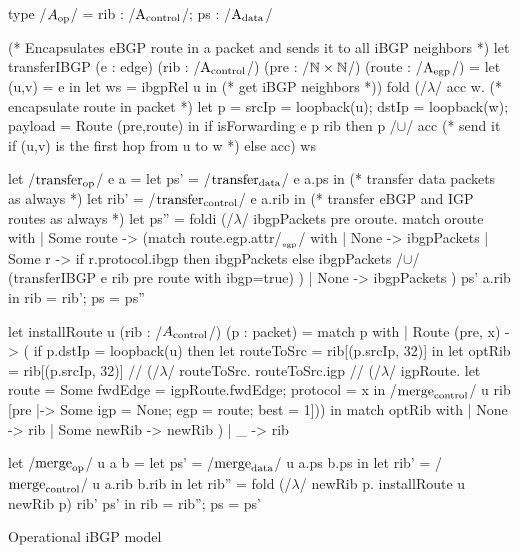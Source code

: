 \documentclass[sigconf,10pt]{acmart}
\begin{document}
\begin{listing}[ht]
  \begin{ocamlcode}
    type /$A_{\op}$/ = { rib : /$\A_{\control}$/; ps : /$\A_{\data}$/ }

    (* Encapsulates eBGP route in a packet and sends it to all iBGP neighbors *)
    let transferIBGP (e : edge) (rib : /$\A_{\control}$/) (pre : /$\nat \times \nat$/) (route : /$\A_{\egp}$/) =
      let (u,v) = e in
      let ws = ibgpRel u in (* get iBGP neighbors *))
      fold (/$\lambda$/ acc w.
       (* encapsulate route in packet *)
        let p = { srcIp = loopback(u);  dstIp = loopback(w);  payload = Route (pre,route) } in
        if isForwarding e p rib then
          {p} /$\cup$/ acc (* send it if (u,v) is the first hop from u to w *)
        else
          acc) {} ws
      
    let /$\transfer_{\op}$/ e a =
      let ps' = /$\transfer_{\data}$/ e a.ps in (* transfer data packets as always *)
      let rib' = /$\transfer_{\control}$/ e a.rib in (* transfer eBGP and IGP routes as always *)
      let ps'' = foldi (/$\lambda$/ ibgpPackets pre oroute.
                        match oroute with
                        | Some route ->
                          (match route.egp.attr/$_{_\egp}$/ with
                           | None -> ibgpPackets
                           | Some r ->
                             if r.protocol.ibgp then
                               ibgpPackets
                             else
                               ibgpPackets /$\cup$/ (transferIBGP e rib pre {route with ibgp=true})
                           )
                        | None -> ibgpPackets ) ps' a.rib
      in
      { rib = rib'; ps = ps''}
      
    let installRoute u (rib : /$A_{\control}$/) (p : packet) =
      match p with
      | Route (pre, x) -> (
        if p.dstIp = loopback(u) then
          let routeToSrc = rib[(p.srcIp, 32)] in
          let optRib =
            rib[(p.srcIp, 32)] /\bind/
            (/$\lambda$/ routeToSrc. routeToSrc.igp /\bind/
              (/$\lambda$/ igpRoute. let route = Some { fwdEdge = igpRoute.fwdEdge; protocol = x  } in
                           /$\merge_{\control}$/ u rib [pre |-> Some {igp = None; egp = route; best = 1}]))
          in
          match optRib with
          | None -> rib
          | Some newRib -> newRib
        )
      | _ -> rib  
          
    let /$\merge_{\op}$/ u a b =
      let ps' = /$\merge_{\data}$/ u a.ps b.ps in
      let rib' = /$\merge_{\control}$/ u a.rib b.rib in
      let rib'' = fold (/$\lambda$/ newRib p. installRoute u newRib p) rib' ps' in
      { rib = rib''; ps = ps'}
\end{ocamlcode}
\caption{Operational iBGP model}
\label{lst:ibgp-model}
\end{listing}
\end{document}
